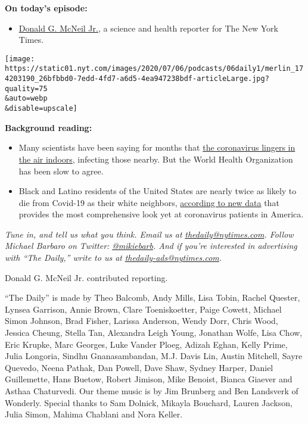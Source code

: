 \textbf{On today's episode:}

\begin{itemize}
\tightlist
\item
  \href{https://www.nytimes.com/by/donald-g-mcneil-jr?smid=pc-thedaily}{Donald
  G. McNeil Jr.}, a science and health reporter for The New York Times.
\end{itemize}

\texttt{[image: https://static01.nyt.com/images/2020/07/06/podcasts/06daily1/merlin\_174203190\_26bfbbd0-7edd-4fd7-a6d5-4ea947238bdf-articleLarge.jpg?quality=75\\\&auto=webp\\\&disable=upscale]}

\textbf{Background reading:}

\begin{itemize}
\item
  Many scientists have been saying for months that
  \href{https://www.nytimes.com/2020/07/04/health/239-experts-with-one-big-claim-the-coronavirus-is-airborne.html}{the
  coronavirus lingers in the air indoors}, infecting those nearby. But
  the World Health Organization has been slow to agree.
\item
  Black and Latino residents of the United States are nearly twice as
  likely to die from Covid-19 as their white neighbors,
  \href{https://www.nytimes.com/interactive/2020/07/05/us/coronavirus-latinos-african-americans-cdc-data.html}{according
  to new data} that provides the most comprehensive look yet at
  coronavirus patients in America.
\end{itemize}

\emph{Tune in, and tell us what you think. Email us at}
\href{mailto:thedaily@nytimes.com}{\emph{thedaily@nytimes.com}}\emph{.
Follow Michael Barbaro on Twitter:}
\href{https://twitter.com/mikiebarb}{\emph{@mikiebarb}}\emph{. And if
you're interested in advertising with ``The Daily,'' write to us at}
\href{mailto:thedaily-ads@nytimes.com}{\emph{thedaily-ads@nytimes.com}}\emph{.}

Donald G. McNeil Jr. contributed reporting.

``The Daily'' is made by Theo Balcomb, Andy Mills, Lisa Tobin, Rachel
Quester, Lynsea Garrison, Annie Brown, Clare Toeniskoetter, Paige
Cowett, Michael Simon Johnson, Brad Fisher, Larissa Anderson, Wendy
Dorr, Chris Wood, Jessica Cheung, Stella Tan, Alexandra Leigh Young,
Jonathan Wolfe, Lisa Chow, Eric Krupke, Marc Georges, Luke Vander Ploeg,
Adizah Eghan, Kelly Prime, Julia Longoria, Sindhu Gnanasambandan, M.J.
Davis Lin, Austin Mitchell, Sayre Quevedo, Neena Pathak, Dan Powell,
Dave Shaw, Sydney Harper, Daniel Guillemette, Hans Buetow, Robert
Jimison, Mike Benoist, Bianca Giaever and Asthaa Chaturvedi. Our theme
music is by Jim Brunberg and Ben Landsverk of Wonderly. Special thanks
to Sam Dolnick, Mikayla Bouchard, Lauren Jackson, Julia Simon, Mahima
Chablani and Nora Keller.

